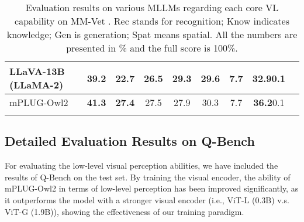 \documentclass[10pt,twocolumn,letterpaper]{article}
\newlength\savewidth
\newcommand\shline{\noalign{\global\savewidth\arrayrulewidth\global\arrayrulewidth 1pt}\hline\noalign{\global\arrayrulewidth\savewidth}}
\newcommand{\modelname}{mPLUG-Owl2\xspace}
\begin{document}
\begin{table*}[t]
\begin{tabular}{lcccccccc}
        LLaVA-13B (LLaMA-2) \cite{Liu2023Llava} &  39.2 &  22.7 &  26.5 &  29.3 & 29.6 & 7.7 &  32.90.1 \\
        \hline
        \modelname &  \textbf{41.3} &  \textbf{27.4} &  27.5 & 27.9 & 30.3 & 7.7 &  \textbf{36.2}0.1 \\
        \shline
    \end{tabular}
    \caption{Evaluation results on various MLLMs regarding each core VL capability on MM-Vet \cite{yu2023mmvet}. Rec stands for recognition; Know indicates knowledge; Gen is generation; Spat means spatial. All the numbers are presented in \% and the full score is 100\%.}
    \label{tab:mmvet_benchmark}
\end{table*}


\subsection{Detailed Evaluation Results on Q-Bench}
For evaluating the low-level visual perception abilities, we have included the results of Q-Bench \cite{wu2023qbench} on the test set. By training the visual encoder, the ability of \modelname in terms of low-level perception has been improved significantly, as it outperforms the model with a stronger visual encoder (i.e., ViT-L (0.3B) v.s. ViT-G (1.9B)), showing the effectiveness of our training paradigm.
\end{document}

